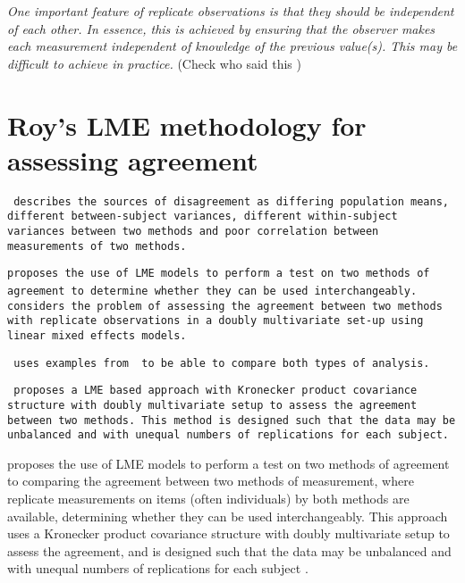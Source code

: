 \documentclass[12pt, a4paper]{article}
\theoremstyle{plain}
\theoremstyle{definition}
\theoremstyle{remark}
\begin{document}
\emph{
	One important feature of replicate observations is that they should be independent
	of each other. In essence, this is achieved by ensuring that the observer makes each
	measurement independent of knowledge of the previous value(s). This may be difficult
	to achieve in practice.} (Check who said this
)

	





\section{Roy's LME methodology for assessing agreement}
\texttt{\citet{Barnhart}  describes the sources of disagreement as
differing population means, different between-subject variances,
different within-subject variances between two methods and poor
correlation between measurements of two methods.	}

\texttt{\citet{ARoy2009}proposes the use of LME models to perform a test
on two methods of agreement to determine whether they can be used
interchangeably.	}
\texttt{ \citet{ARoy2009} considers the problem of assessing the agreement
between two methods with replicate observations in a doubly
multivariate set-up using linear mixed effects models.}


\texttt{\citet{ARoy2009} uses examples from \citet{BA86} to be able to
compare both types of analysis.}

\texttt{\citet{ARoy2009} proposes a LME based approach with Kronecker
product covariance structure with doubly multivariate setup to
assess the agreement between two methods. This method is designed
such that the data may be unbalanced and with unequal numbers of
replications for each subject.}


\newpage

		
\citet{ARoy2009} proposes the use of LME models to perform a test on two methods of agreement to comparing the agreement between two methods of measurement, where replicate measurements on items (often individuals) by both methods are available, determining whether they can be used
interchangeably. This approach uses a Kronecker product covariance structure with doubly multivariate setup to
assess the agreement, and is designed such that the data may be unbalanced and with unequal numbers of replications for each subject \citep{ARoy2009}.
			
\end{document}
